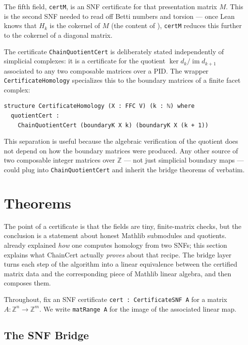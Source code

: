 \documentclass[11pt]{article}
\theoremstyle{plain}
\theoremstyle{definition}
\theoremstyle{remark}
\newcommand{\lean}[1]{\lstinline[language=lean]|#1|}
\begin{document}
The fifth field, \lean{certM}, is an SNF certificate for that presentation
matrix \(M\). This is the second SNF needed to read off Betti numbers and
torsion --- once Lean knows that \(H_k\) is the cokernel of \(M\) (the content
of ), \lean{certM} reduces this further to the cokernel of
a diagonal matrix.

The certificate \lean{ChainQuotientCert} is deliberately stated independently
of simplicial complexes: it is a certificate for the quotient
\(\ker d_k / \operatorname{im} d_{k+1}\) associated to any two composable
matrices over a PID. The wrapper \lean{CertificateHomology} specializes this
to the boundary matrices of a finite facet complex:

\begin{lstlisting}[caption={The homology certificate for a finite facet complex.},label={lst:homology-certificate}]
structure CertificateHomology (X : FFC V) (k : ℕ) where
  quotientCert :
    ChainQuotientCert (boundaryK X k) (boundaryK X (k + 1))
\end{lstlisting}

This separation is useful because the algebraic verification of the quotient
does not depend on how the boundary matrices were produced. Any other source
of two composable integer matrices over \(\mathbb{Z}\) --- not just
simplicial boundary maps --- could plug into \lean{ChainQuotientCert} and
inherit the bridge theorems of  verbatim.

\section{Theorems}\label{sec:theorems}

The point of a certificate is that the fields are tiny, finite-matrix checks,
but the conclusion is a statement about honest Mathlib submodules and
quotients.  already explained \emph{how} one computes
homology from two SNFs; this section explains what ChainCert actually
\emph{proves} about that recipe. The bridge layer turns each step of the
algorithm into a linear equivalence between the certified matrix data and the
corresponding piece of Mathlib linear algebra, and then composes them.

Throughout, fix an SNF certificate \lean{cert : CertificateSNF A} for a matrix
\(A : \mathbb{Z}^n \to \mathbb{Z}^m\). We write \lean{matRange A} for the image
of the associated linear map.

\subsection{The SNF Bridge}
\end{document}

